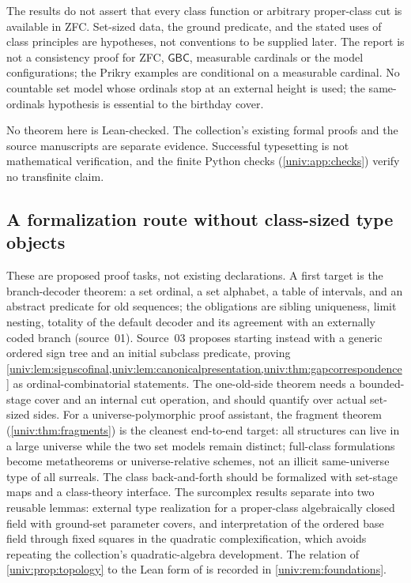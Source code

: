 \documentclass[11pt,letterpaper]{article}
\numberwithin{equation}{section}
\theoremstyle{definition}
\theoremstyle{remark}
\newcommand{\GBC}{\mathsf{GBC}}
\begin{document}
The results do not assert that every class function or arbitrary proper-class
cut is available in ZFC. Set-sized data, the ground predicate, and the stated
uses of class principles are hypotheses, not conventions to be supplied later.
The report is not a consistency proof for ZFC, $\GBC$, measurable cardinals or
the model configurations; the Prikry examples are conditional on a measurable
cardinal. No countable set model whose ordinals stop at an external height is
used; the same-ordinals hypothesis is essential to the birthday cover.

No theorem here is Lean-checked. The collection's existing formal proofs and
the source manuscripts are separate evidence. Successful typesetting is not
mathematical verification, and the finite Python checks
(\cref{univ:app:checks}) verify no transfinite claim.

\subsection{A formalization route without class-sized type objects}

These are proposed proof tasks, not existing declarations. A first target is
the branch-decoder theorem: a set ordinal, a set alphabet, a table of
intervals, and an abstract predicate for old sequences; the obligations are
sibling uniqueness, limit nesting, totality of the default decoder and its
agreement with an externally coded branch (source~01). Source~03 proposes
starting instead with a generic ordered sign tree and an initial subclass
predicate, proving
\cref{univ:lem:signscofinal,univ:lem:canonicalpresentation,univ:thm:gapcorrespondence}
as ordinal-combinatorial statements. The one-old-side theorem needs a
bounded-stage cover and an internal cut operation, and should quantify over
actual set-sized sides. For a universe-polymorphic proof assistant, the
fragment theorem (\cref{univ:thm:fragments}) is the cleanest end-to-end target:
all structures can live in a large universe while the two set models remain
distinct; full-class formulations become metatheorems or universe-relative
schemes, not an illicit same-universe type of all surreals. The class
back-and-forth should be formalized with set-stage maps and a class-theory
interface. The surcomplex results separate into two reusable lemmas: external
type realization for a proper-class algebraically closed field with ground-set
parameter covers, and interpretation of the ordered base field through fixed
squares in the quadratic complexification, which avoids repeating the
collection's quadratic-algebra development. The relation of
\cref{univ:prop:topology} to the Lean form of  is
recorded in \cref{univ:rem:foundations}.
\end{document}
